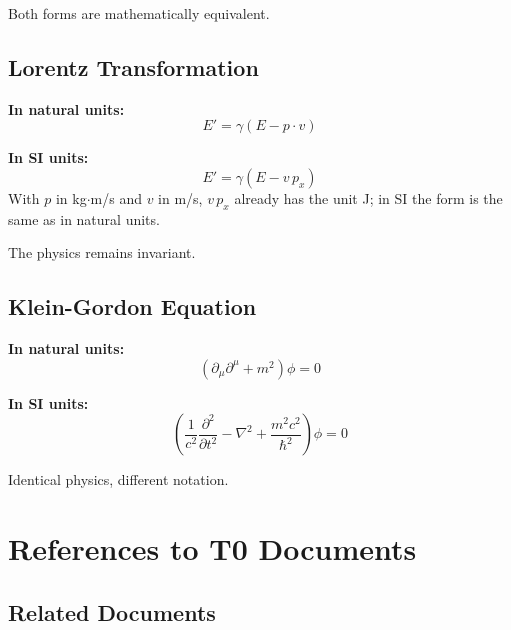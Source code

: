 	Both forms are mathematically equivalent.
	
	\subsection{Lorentz Transformation}
	
	\textbf{In natural units:}
	\begin{equation}
		E' = \gamma (E - p \cdot v)
	\end{equation}
	
	\textbf{In SI units:}
	\begin{equation}
		E' = \gamma (E - v\, p_x)
	\end{equation}
	With $p$ in kg$\cdot$m/s and $v$ in m/s, $v\,p_x$ already has the unit J; in SI the form is the same as in natural units.
	
	The physics remains invariant.
	
	\subsection{Klein-Gordon Equation}
	
	\textbf{In natural units:}
	\begin{equation}
		(\partial_\mu \partial^\mu + m^2) \phi = 0
	\end{equation}
	
	\textbf{In SI units:}
	\begin{equation}
		\left(\frac{1}{c^2} \frac{\partial^2}{\partial t^2} - \nabla^2 + \frac{m^2c^2}{\hbar^2}\right) \phi = 0
	\end{equation}
	
	Identical physics, different notation.
	
	\section{References to T0 Documents}
	
	\subsection{Related Documents}
	
